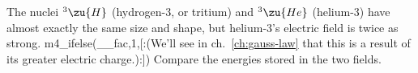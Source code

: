The nuclei ${}^3\zu{H}$ (hydrogen-3, or tritium) and ${}^3\zu{He}$ (helium-3)
have almost exactly the same size and shape, but helium-3's electric field
is twice as strong.
m4_ifelse(__fac,1,[:(We'll see in ch.~\ref{ch:gauss-law} that this is a result of its greater electric charge.):])
Compare the energies stored in the two fields.
\answercheck\hwendpart
